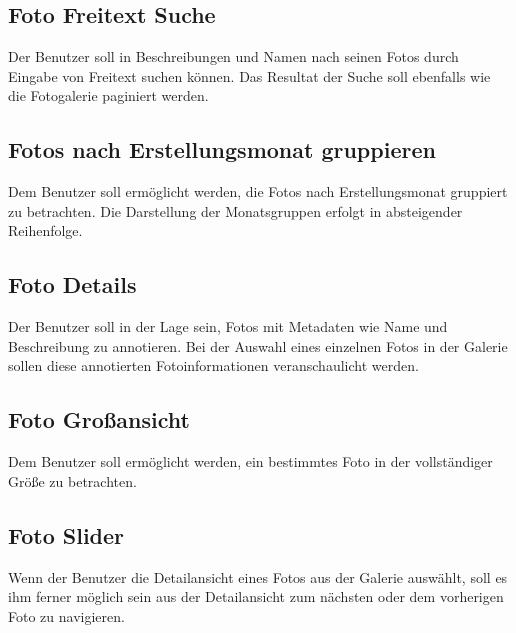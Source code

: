 \subsection{Foto Freitext Suche}
\label{sec:spec:photo_search}

Der Benutzer soll in Beschreibungen und Namen nach seinen Fotos durch Eingabe von Freitext suchen können. Das Resultat der Suche soll ebenfalls wie die Fotogalerie paginiert werden.

\subsection{Fotos nach Erstellungsmonat gruppieren}
\label{sec:spec:photo_groups}

Dem Benutzer soll ermöglicht werden, die Fotos nach Erstellungsmonat gruppiert zu betrachten. Die Darstellung der Monatsgruppen erfolgt in absteigender Reihenfolge.

\subsection{Foto Details}
\label{sec:spec:photo_details}

Der Benutzer soll in der Lage sein, Fotos mit Metadaten wie Name und Beschreibung zu annotieren. Bei der Auswahl eines einzelnen Fotos in der Galerie sollen diese annotierten Fotoinformationen veranschaulicht werden.

\subsection{Foto Großansicht}

Dem Benutzer soll ermöglicht werden, ein bestimmtes Foto in der vollständiger Größe zu betrachten.

\subsection{Foto Slider}
\label{sec:spec:photo_slider}

Wenn der Benutzer die Detailansicht eines Fotos aus der Galerie auswählt, soll es ihm ferner möglich sein aus der Detailansicht zum nächsten oder dem vorherigen Foto zu navigieren.
